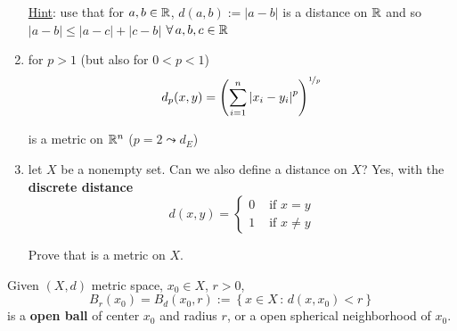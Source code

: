 \begin{enumerate}
\begin{home}
    \underline{Hint}: use that for $a,b\in\mathbb{R}$, $d(a,b):=|a-b|$ is a distance on $\mathbb{R}$ and so $|a-b|\leq|a-c|+|c-b|$ $\forall a,b,c\in\RR$
    \newline
    \newline
    \newline
    \end{home}

    \item for $p>1$ (but also for $0<p<1$)
    \begin{equation*}
        d_p(x,y)=\left(\sum^{n}_{i=1} \left\lvert x_i-y_i \right\rvert^p  \right)^{\nicefrac{1}{p}}
    \end{equation*}

    is a metric on $\mathbb{R}^n$ ($p=2\leadsto d_E$)

    \item let $X$ be a nonempty set. Can we also define a distance on $X$? Yes, with the \textbf{discrete distance}
    \begin{equation*}
        d(x,y)=\begin{cases}
            0 &\text{ if }x=y\\
            1 &\text{ if }x\neq y            
        \end{cases}
    \end{equation*}

    \begin{home}
    Prove that is a metric on $X$.
    \newline
    \newline
    \newline
    \end{home}
\end{enumerate}

\begin{defn}
Given $(X,d)$ metric space, $x_0\in X$, $r>0$,
\begin{equation*}
    B_r(x_0)=B_d(x_0,r):=\left\{ x\in X\,:\,d(x,x_0)<r \right\}
\end{equation*}
is a \textbf{open ball} of center $x_0$ and radius $r$, or a open spherical neighborhood of $x_0$.
\end{defn}

